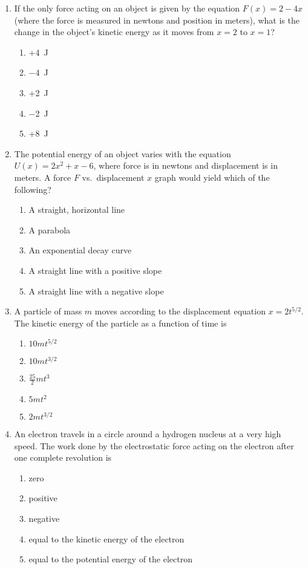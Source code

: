 \documentclass{../../../oss-apphys}
\begin{document}
\begin{multicols}{2}
\begin{enumerate}[leftmargin=18pt,resume]
  \item If the only force acting on an object is given by the equation
    $F(x)=2-4x$ (where the force is measured in newtons and position in meters),
    what is the change in the object's kinetic energy as it moves from $x=2$ to
    $x=1$?
    \begin{enumerate}[nosep,leftmargin=18pt,label=(\Alph*)]
    \item +\SI{4}{\joule}
    \item \SI{-4}{\joule}
    \item +\SI{2}{\joule}
    \item \SI{-2}{\joule}
    \item +\SI{8}{\joule}
    \end{enumerate}
    
  \item The potential energy of an object varies with the equation
    $U(x)=2x^2+x-6$, where force is in newtons and displacement is in meters. A
    force $F$ vs.\ displacement $x$ graph would yield which of the following?
    \begin{enumerate}[nosep,leftmargin=18pt,label=(\Alph*)]
    \item A straight, horizontal line
    \item A parabola
    \item An exponential decay curve
    \item A straight line with a positive slope
    \item A straight line with a negative slope
    \end{enumerate}
    
  \item A particle of mass $m$ moves according to the displacement equation
    $x=2t^{5/2}$. The kinetic energy of the particle as a function of time is
    \begin{enumerate}[nosep,leftmargin=18pt,label=(\Alph*)]
    \item $10mt^{5/2}$
    \item $10mt^{3/2}$
    \item $\displaystyle\frac{25}2mt^3$
    \item $5mt^2$
    \item $2mt^{3/2}$
    \end{enumerate}

  \item An electron travels in a circle around a hydrogen nucleus at a very high
    speed. The work done by the electrostatic force acting on the electron
    after one complete revolution is
    \begin{enumerate}[nosep,leftmargin=18pt,label=(\Alph*)]
    \item zero
    \item positive
    \item negative
    \item equal to the kinetic energy of the electron
    \item equal to the potential energy of the electron
    \end{enumerate}
    

\end{enumerate}
\end{multicols}
\end{document}
